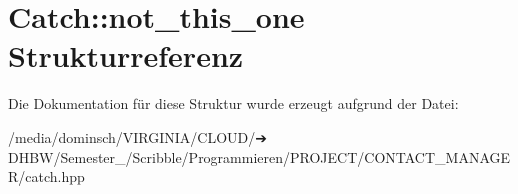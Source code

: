 \hypertarget{structCatch_1_1not__this__one}{}\section{Catch\+:\+:not\+\_\+this\+\_\+one Strukturreferenz}
\label{structCatch_1_1not__this__one}


Die Dokumentation für diese Struktur wurde erzeugt aufgrund der Datei\+:\begin{DoxyCompactItemize}
\item 
/media/dominsch/\+V\+I\+R\+G\+I\+N\+I\+A/\+C\+L\+O\+U\+D/➔ D\+H\+B\+W/\+Semester\+\_/\+Scribble/\+Programmieren/\+P\+R\+O\+J\+E\+C\+T/\+C\+O\+N\+T\+A\+C\+T\+\_\+\+M\+A\+N\+A\+G\+E\+R/catch.\+hpp\end{DoxyCompactItemize}
